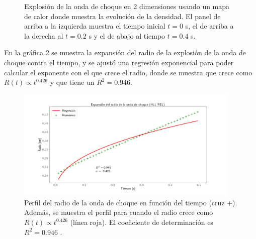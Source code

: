 \documentclass[12pt,a4paper]{book}
\begin{document}
\begin{figure}
    \caption{Explosión de la onda de choque en 2 dimensiones usando un mapa de calor donde muestra
    la evolución de la densidad. El panel de arriba a la izquierda muestra el tiempo inicial $t=0$ s,
    el de arriba a la derecha  al $t = 0.2$ s y el de abajo al tiempo $t = 0.4$ s. 
    \label{fig:head_map}}
\end{figure}

{\color{blue} En la gráfica \ref{fig:Expansion_radio_vs_tiempo} se muestra la expansión del radio de la explosión de la onda de choque contra el tiempo, y se ajustó una regresión exponencial para poder calcular 
el exponente con el que crece el radio, donde se muestra que crece como $R(t) \propto t^{0.426}$ y que tiene un $R^2 = 0.946$.}

\begin{figure}
    \begin{center}
      \includegraphics[width=0.95\textwidth]{./Figuras/verificacion_del_codigo/pruebas_2D/expansion_radio/Expansion.png}
    \end{center}
    \caption{{\color{blue} Perfil del radio de la onda de choque en función del tiempo (cruz +). Además, se muestra el perfil para cuando el radio crece como $R(t) \propto t^{0.426}$ (línea roja).
    El coeficiente de determinación es $R^2 = 0.946$} .}    
    \label{fig:Expansion_radio_vs_tiempo}
\end{figure}
\end{document}
